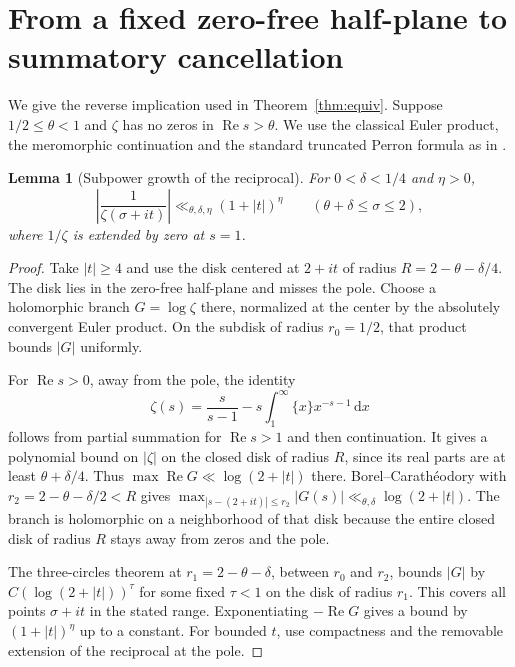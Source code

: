 \documentclass[11pt]{amsart}
\newtheorem{lemma}[theorem]{Lemma}
\theoremstyle{definition}
\theoremstyle{remark}
\newcommand{\R}{\operatorname{Re}}
\newcommand{\dd}{\,\mathrm d}
\numberwithin{equation}{section}
\begin{document}





\appendix
\section{From a fixed zero-free half-plane to summatory cancellation}\label{sec:perron}

We give the reverse implication used in Theorem~\ref{thm:equiv}. Suppose \(1/2\le\theta<1\) and \(\zeta\) has no zeros in \(\R s>\theta\). We use the classical Euler product, the meromorphic continuation and the standard truncated Perron formula as in \cite{titchmarsh}.

\begin{lemma}[Subpower growth of the reciprocal]\label{lem:subpower}
For \(0<\delta<1/4\) and \(\eta>0\),
\[
 \left|\frac{1}{\zeta(\sigma+it)}\right|
 \ll_{\theta,\delta,\eta}(1+|t|)^\eta
 \qquad(\theta+\delta\le\sigma\le2),
\]
where \(1/\zeta\) is extended by zero at \(s=1\).
\end{lemma}
\begin{proof}
Take \(|t|\ge4\) and use the disk centered at \(2+it\) of radius \(R=2-\theta-\delta/4\). The disk lies in the zero-free half-plane and misses the pole. Choose a holomorphic branch \(G=\log\zeta\) there, normalized at the center by the absolutely convergent Euler product. On the subdisk of radius \(r_0=1/2\), that product bounds \(|G|\) uniformly.

For \(\R s>0\), away from the pole, the identity
\[
 \zeta(s)=\frac{s}{s-1}-s\int_1^\infty \{x\}x^{-s-1}\dd x
\]
follows from partial summation for \(\R s>1\) and then continuation. It gives a polynomial bound on \(|\zeta|\) on the closed disk of radius \(R\), since its real parts are at least \(\theta+\delta/4\). Thus \(\max\R G\ll\log(2+|t|)\) there. Borel--Carath\'eodory with \(r_2=2-\theta-\delta/2<R\) gives \(\max_{|s-(2+it)|\le r_2}|G(s)|\ll_{\theta,\delta}\log(2+|t|)\). The branch is holomorphic on a neighborhood of that disk because the entire closed disk of radius \(R\) stays away from zeros and the pole.

The three-circles theorem at \(r_1=2-\theta-\delta\), between \(r_0\) and \(r_2\), bounds \(|G|\) by \(C(\log(2+|t|))^\tau\) for some fixed \(\tau<1\) on the disk of radius \(r_1\). This covers all points \(\sigma+it\) in the stated range. Exponentiating \(-\R G\) gives a bound by \((1+|t|)^\eta\) up to a constant. For bounded \(t\), use compactness and the removable extension of the reciprocal at the pole.
\end{proof}
\end{document}
